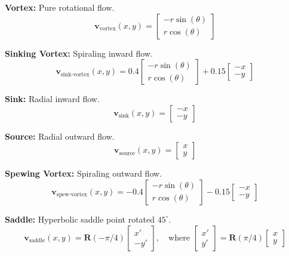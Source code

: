 \documentclass[lettersize,journal]{IEEEtran}
\begin{document}
\textbf{Vortex:} Pure rotational flow.
\begin{equation}
\mathbf{v}_{\text{vortex}}(x, y) = \begin{bmatrix} -r \sin(\theta) \\ r \cos(\theta) \end{bmatrix}
\end{equation}

\textbf{Sinking Vortex:} Spiraling inward flow.
\begin{equation}
\mathbf{v}_{\text{sink-vortex}}(x, y) = 0.4 \begin{bmatrix} -r \sin(\theta) \\ r \cos(\theta) \end{bmatrix} + 0.15 \begin{bmatrix} -x \\ -y \end{bmatrix}
\end{equation}

\textbf{Sink:} Radial inward flow.
\begin{equation}
\mathbf{v}_{\text{sink}}(x, y) = \begin{bmatrix} -x \\ -y \end{bmatrix}
\end{equation}

\textbf{Source:} Radial outward flow.
\begin{equation}
\mathbf{v}_{\text{source}}(x, y) = \begin{bmatrix} x \\ y \end{bmatrix}
\end{equation}

\textbf{Spewing Vortex:} Spiraling outward flow.
\begin{equation}
\mathbf{v}_{\text{spew-vortex}}(x, y) = -0.4 \begin{bmatrix} -r \sin(\theta) \\ r \cos(\theta) \end{bmatrix} - 0.15 \begin{bmatrix} -x \\ -y \end{bmatrix}
\end{equation}

\textbf{Saddle:} Hyperbolic saddle point rotated $45^\circ$.
\begin{equation}
\mathbf{v}_{\text{saddle}}(x, y) = \mathbf{R}(-\pi/4) \begin{bmatrix} x' \\ -y' \end{bmatrix}, \quad \text{where } \begin{bmatrix} x' \\ y' \end{bmatrix} = \mathbf{R}(\pi/4) \begin{bmatrix} x \\ y \end{bmatrix}
\end{equation}
\end{document}
